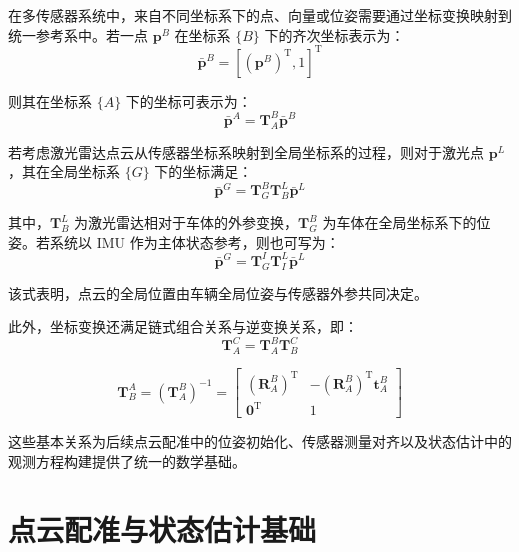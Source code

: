 在多传感器系统中，来自不同坐标系下的点、向量或位姿需要通过坐标变换映射到统一参考系中。若一点 $\mathbf{p}^{B}$ 在坐标系 $\{B\}$ 下的齐次坐标表示为：
\begin{equation}
\bar{\mathbf{p}}^{B}
=
\left[
\left(\mathbf{p}^{B}\right)^{\mathrm T},1
\right]^{\mathrm T}
\end{equation}

则其在坐标系 $\{A\}$ 下的坐标可表示为：
\begin{equation}
\bar{\mathbf{p}}^{A}
=
\mathbf{T}_{A}^{B}\bar{\mathbf{p}}^{B}
\end{equation}

若考虑激光雷达点云从传感器坐标系映射到全局坐标系的过程，则对于激光点 $\mathbf{p}^{L}$，其在全局坐标系 $\{G\}$ 下的坐标满足：
\begin{equation}
\bar{\mathbf{p}}^{G}
=
\mathbf{T}_{G}^{B}\mathbf{T}_{B}^{L}\bar{\mathbf{p}}^{L}
\end{equation}

其中，$\mathbf{T}_{B}^{L}$ 为激光雷达相对于车体的外参变换，$\mathbf{T}_{G}^{B}$ 为车体在全局坐标系下的位姿。若系统以 IMU 作为主体状态参考，则也可写为：
\begin{equation}
\bar{\mathbf{p}}^{G}
=
\mathbf{T}_{G}^{I}\mathbf{T}_{I}^{L}\bar{\mathbf{p}}^{L}
\end{equation}

该式表明，点云的全局位置由车辆全局位姿与传感器外参共同决定。

此外，坐标变换还满足链式组合关系与逆变换关系，即：
\begin{equation}
\mathbf{T}_{A}^{C}
=
\mathbf{T}_{A}^{B}\mathbf{T}_{B}^{C}
\end{equation}

\begin{equation}
\mathbf{T}_{B}^{A}
=
\left(\mathbf{T}_{A}^{B}\right)^{-1}
=
\begin{bmatrix}
\left(\mathbf{R}_{A}^{B}\right)^{\mathrm T} &
-\left(\mathbf{R}_{A}^{B}\right)^{\mathrm T}\mathbf{t}_{A}^{B}\\
\mathbf{0}^{\mathrm T} & 1
\end{bmatrix}
\end{equation}

这些基本关系为后续点云配准中的位姿初始化、传感器测量对齐以及状态估计中的观测方程构建提供了统一的数学基础。

\section{点云配准与状态估计基础}

